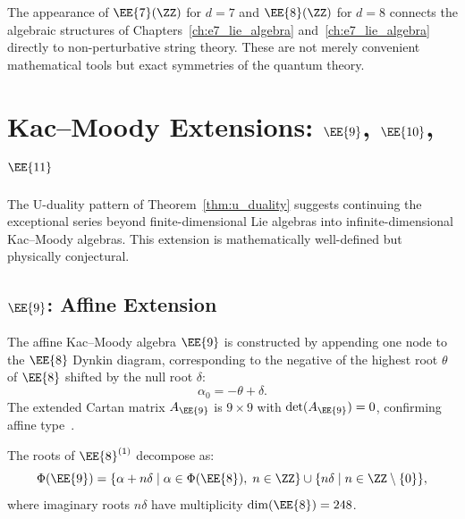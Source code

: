\begin{remark}
The appearance of $\EE{7}(\ZZ)$ for $d=7$ and $\EE{8}(\ZZ)$ for $d=8$
connects the algebraic structures of Chapters~\ref{ch:e7_lie_algebra}
and~\ref{ch:e7_lie_algebra} directly to non-perturbative string theory.
These are not merely convenient mathematical tools but exact symmetries
of the quantum theory.
\end{remark}

\section{Kac--Moody Extensions: $\EE{9}$, $\EE{10}$, $\EE{11}$}
\label{sec:kac_moody}

The U-duality pattern of Theorem~\ref{thm:u_duality} suggests continuing the
exceptional series beyond finite-dimensional Lie algebras into infinite-dimensional
Kac--Moody algebras.  This extension is mathematically well-defined but physically
conjectural.

\subsection{$\EE{9}$: Affine Extension}

\begin{definition}[$\EE{9} = \EE{8}^{(1)}$]
\label{def:e9}
The affine Kac--Moody algebra $\EE{9}$ is constructed by appending one node
to the $\EE{8}$ Dynkin diagram, corresponding to the negative of the highest
root $\theta$ of $\EE{8}$ shifted by the null root $\delta$:
\begin{equation}
\alpha_0 = -\theta + \delta.
\end{equation}
The extended Cartan matrix $A_{\EE{9}}$ is $9 \times 9$ with
$\det(A_{\EE{9}}) = 0$, confirming affine type~\cite{kac1990infinite}.
\end{definition}

\begin{proposition}
\label{prop:e9_roots}
The roots of $\EE{8}^{(1)}$ decompose as:
\begin{equation}
\Phi(\EE{9}) = \{\alpha + n\delta \mid \alpha \in \Phi(\EE{8}),\; n \in \ZZ\}
\cup \{n\delta \mid n \in \ZZ \setminus \{0\}\},
\end{equation}
where imaginary roots $n\delta$ have multiplicity $\dim(\EE{8}) = 248$.
\end{proposition}

